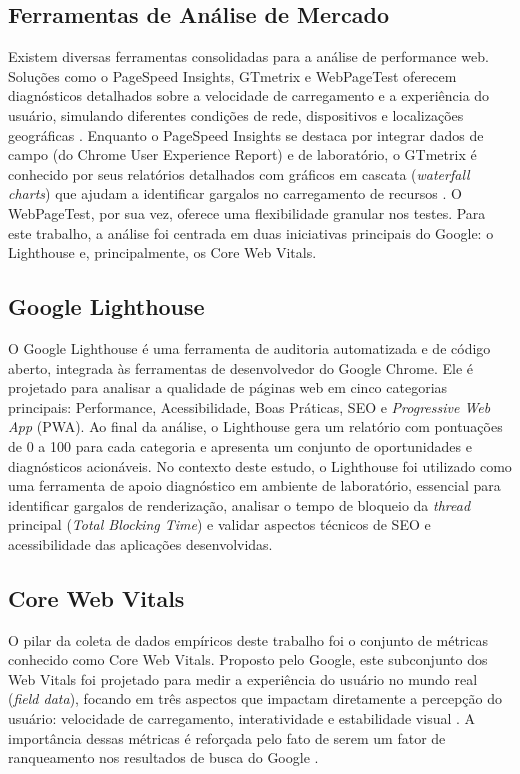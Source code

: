 \subsection{Ferramentas de Análise de Mercado}
\label{subsec:ferramentas-analise}
Existem diversas ferramentas consolidadas para a análise de performance web. Soluções como o PageSpeed Insights, GTmetrix e WebPageTest oferecem diagnósticos detalhados sobre a velocidade de carregamento e a experiência do usuário, simulando diferentes condições de rede, dispositivos e localizações geográficas \cite{webabsoluta_ferramentas}. Enquanto o PageSpeed Insights se destaca por integrar dados de campo (do Chrome User Experience Report) e de laboratório, o GTmetrix é conhecido por seus relatórios detalhados com gráficos em cascata (\textit{waterfall charts}) que ajudam a identificar gargalos no carregamento de recursos \cite{gtmetrix_vitals}. O WebPageTest, por sua vez, oferece uma flexibilidade granular nos testes. Para este trabalho, a análise foi centrada em duas iniciativas principais do Google: o Lighthouse e, principalmente, os Core Web Vitals.

\subsection{Google Lighthouse}
\label{subsec:google-lighthouse}
O Google Lighthouse é uma ferramenta de auditoria automatizada e de código aberto, integrada às ferramentas de desenvolvedor do Google Chrome. Ele é projetado para analisar a qualidade de páginas web em cinco categorias principais: Performance, Acessibilidade, Boas Práticas, SEO e \textit{Progressive Web App} (PWA). Ao final da análise, o Lighthouse gera um relatório com pontuações de 0 a 100 para cada categoria e apresenta um conjunto de oportunidades e diagnósticos acionáveis. No contexto deste estudo, o Lighthouse foi utilizado como uma ferramenta de apoio diagnóstico em ambiente de laboratório, essencial para identificar gargalos de renderização, analisar o tempo de bloqueio da \textit{thread} principal (\textit{Total Blocking Time}) e validar aspectos técnicos de SEO e acessibilidade das aplicações desenvolvidas.

\subsection{Core Web Vitals}
\label{subsec:core-web-vitals}
O pilar da coleta de dados empíricos deste trabalho foi o conjunto de métricas conhecido como Core Web Vitals. Proposto pelo Google, este subconjunto dos Web Vitals foi projetado para medir a experiência do usuário no mundo real (\textit{field data}), focando em três aspectos que impactam diretamente a percepção do usuário: velocidade de carregamento, interatividade e estabilidade visual \cite{osmani2025}. A importância dessas métricas é reforçada pelo fato de serem um fator de ranqueamento nos resultados de busca do Google \cite{google_cwv_search}.

